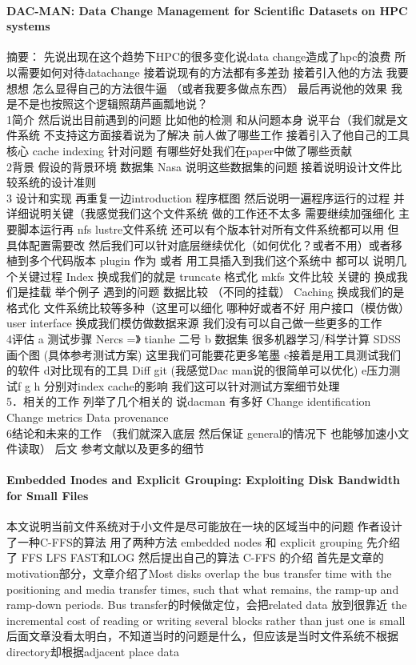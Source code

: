 \documentclass[8pt,UTF8]{article}
\begin{document}
            \paragraph{DAC-MAN: Data Change Management for Scientific Datasets on HPC systems}
                摘要： 先说出现在这个趋势下HPC的很多变化说data change造成了hpc的浪费 所以需要如何对待datachange
                接着说现有的方法都有多差劲 接着引入他的方法 我要想想 怎么显得自己的方法很牛逼 （或者我要多做点东西） 最后再说他的效果 我是不是也按照这个逻辑照葫芦画瓢地说？
                \\ 1简介 然后说出目前遇到的问题 比如他的检测 和从问题本身 说平台（我们就是文件系统 不支持这方面接着说为了解决 前人做了哪些工作 接着引入了他自己的工具 核心 cache indexing 针对问题 有哪些好处我们在paper中做了哪些贡献
                \\ 2背景 假设的背景环境 数据集 Nasa 说明这些数据集的问题 接着说明设计文件比较系统的设计准则
                \\ 3 设计和实现 再重复一边introduction 程序框图  然后说明一遍程序运行的过程 并详细说明关键（我感觉我们这个文件系统 做的工作还不太多 需要继续加强细化 主要脚本运行再 nfs lustre文件系统 还可以有个版本针对所有文件系统都可以用 但具体配置需要改 然后我们可以针对底层继续优化（如何优化？或者不用）或者移植到多个代码版本 plugin 作为 或者 用工具插入到我们这个系统中 都可以 说明几个关键过程 Index 换成我们的就是 truncate 格式化 mkfs  文件比较 关键的 换成我们是挂载  举个例子 遇到的问题 数据比较 （不同的挂载） Caching 换成我们的是格式化 文件系统比较等多种（这里可以细化 哪种好或者不好 用户接口（模仿做） user interface 换成我们模仿做数据来源 我们没有可以自己做一些更多的工作
                \\ 4评估 a 测试步骤 Nercs =》 tianhe 二号 b 数据集 很多机器学习/科学计算 SDSS 画个图 (具体参考测试方案) 这里我们可能要花更多笔墨 c接着是用工具测试我们的软件 d对比现有的工具 Diff git (我感觉Dac man说的很简单可以优化) e压力测试f g h 分别对index cache的影响 我们这可以针对测试方案细节处理
                \\ 5．相关的工作 列举了几个相关的 说dacman 有多好 Change identification Change metrics Data provenance
                \\ 6结论和未来的工作 （我们就深入底层 然后保证 general的情况下 也能够加速小文件读取） 后文 参考文献以及更多的细节
            \paragraph{Embedded Inodes and Explicit Grouping: Exploiting Disk Bandwidth for Small Files}            
                本文说明当前文件系统对于小文件是尽可能放在一块的区域当中的问题 作者设计了一种C-FFS的算法 用了两种方法 embedded nodes 和 explicit grouping  先介绍了 FFS LFS FAST和LOG  然后提出自己的算法 C-FFS 的介绍 首先是文章的motivation部分，文章介绍了Most disks overlap the bus transfer time with the positioning and media transfer times, such that what remains, the ramp-up and ramp-down periods. Bus transfer的时候做定位，会把related data 放到很靠近 the incremental cost of reading or writing several blocks rather than just one is small 后面文章没看太明白，不知道当时的问题是什么，但应该是当时文件系统不根据directory却根据adjacent place data
\end{document}
